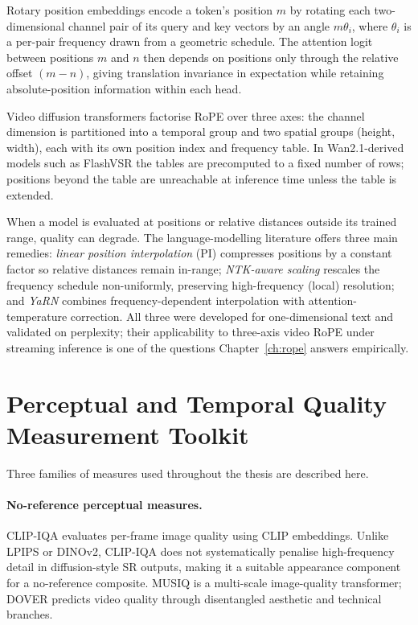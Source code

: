 Rotary position embeddings \cite{su_roformer_2024} encode a token's position $m$ by
rotating each two-dimensional channel pair of its query and key vectors by an angle
$m\theta_i$, where $\theta_i$ is a per-pair frequency drawn from a geometric schedule.
The attention logit between positions $m$ and $n$ then depends on positions only through
the relative offset $(m-n)$, giving translation invariance in expectation while retaining
absolute-position information within each head.

Video diffusion transformers factorise RoPE over three axes: the channel dimension is
partitioned into a temporal group and two spatial groups (height, width), each with its
own position index and frequency table. In Wan2.1-derived models such as FlashVSR the
tables are precomputed to a fixed number of rows; positions beyond the table are
unreachable at inference time unless the table is extended.

When a model is evaluated at positions or relative distances outside its trained range,
quality can degrade. The language-modelling literature offers three main remedies:
\emph{linear position interpolation} (PI) \cite{chen_pi_2023} compresses positions by a
constant factor so relative distances remain in-range; \emph{NTK-aware scaling}
\cite{bloc97_ntk_2023} rescales the frequency schedule non-uniformly, preserving
high-frequency (local) resolution; and \emph{YaRN} \cite{peng_yarn_2023} combines
frequency-dependent interpolation with attention-temperature correction. All three were
developed for one-dimensional text and validated on perplexity; their applicability to
three-axis video RoPE under streaming inference is one of the questions
Chapter~\ref{ch:rope} answers empirically.

\section{Perceptual and Temporal Quality Measurement Toolkit}
\label{sec:found:toolkit}

Three families of measures used throughout the thesis are described here.

\paragraph{No-reference perceptual measures.} CLIP-IQA \cite{wang_clipiqa_2023} evaluates
per-frame image quality using CLIP \cite{radford_learning_2021} embeddings. Unlike LPIPS
or DINOv2, CLIP-IQA does not systematically penalise high-frequency detail in
diffusion-style SR outputs, making it a suitable appearance component for a no-reference
composite. MUSIQ \cite{ke_musiq_2021} is a multi-scale image-quality transformer; DOVER
\cite{wu_dover_2023} predicts video quality through disentangled aesthetic and technical
branches.

